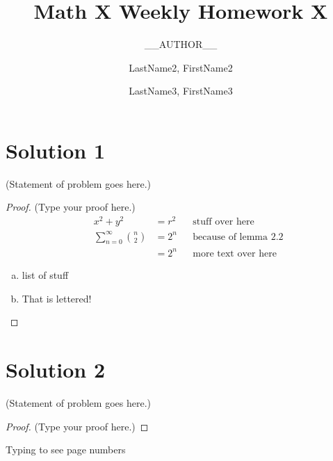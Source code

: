 \documentclass[12pt]{article}
\title{Math X Weekly Homework X}
\author{
  __AUTHOR__
  \and
  LastName2, FirstName2
  \and
  LastName3, FirstName3
}
\begin{document}
\maketitle

\vspace{0.5in}



\section*{Solution 1}
(Statement of problem goes here.)\\
\begin{proof}
(Type your proof here.)
\begin{align*}
  && x^2 + y^2 &= r^2 && \text{stuff over here}\\
  && \sum_{n=0}^{\infty} {n \choose 2} &= 2^n && \text{because of lemma 2.2}\\
  && &= 2^n && \text{more text over here}
\end{align*}
\begin{enumerate}[(a)]
  \item
    list of stuff
  \item
    That is lettered!

  
\end{enumerate}
\end{proof}

\clearpage


\section*{Solution 2}
(Statement of problem goes here.)\\

\begin{proof}
(Type your proof here.)

\end{proof}

\vspace{2in} %

\vspace{3in}
Typing to see page numbers
\end{document}
